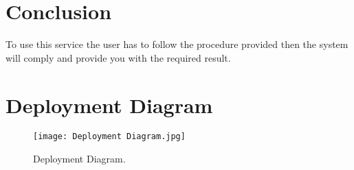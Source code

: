 \documentclass[runningheads,a4paper]{article}
\begin{document}
\section{Conclusion}
To use this service the user has to follow the procedure provided then the system will comply and provide you with the required result.

\section{Deployment Diagram}

\begin{figure}[h!]
  \texttt{[image: Deployment Diagram.jpg]}
  \caption{Deployment Diagram.}
  \label{fig:Deployment Diagram}
\end{figure}
\end{document}
